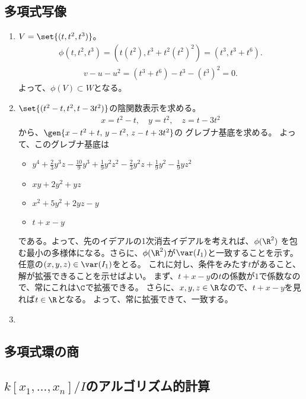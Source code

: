 \label{sec:多様体上の多項式関数と有理関数}

\subsection{多項式写像}
\label{sub:多項式写像}
\begin{enumerate}[label=(\arabic*)]
  \item
  $V=\set{(t,t^2,t^3)}$。
  \begin{align}
    \phi(t,t^2,t^3)=
    (t(t^2),t^3+t^2(t^2)^2)
    =
    (t^3, t^3+t^6).
  \end{align}
  \begin{align}
    v-u-u^2 = (t^3+t^6)-t^3-(t^3)^2 = 0.
  \end{align}
  よって、$\phi(V) \subset W$となる。
  \item
  $\set{(t^2-t,t^2,t-3t^2)}$の陰関数表示を求める。
  \begin{align}
    x=t^2-t,\quad y = t^2,\quad z=t-3t^2
  \end{align}
  から、$\gen{x-t^2+t,\, y-t^2,\, z-t+3t^2}$の
  グレブナ基底を求める。
  よって、このグレブナ基底は
  \begin{itemize}
    \item $y^4 + \frac{2}{3}y^3 z - \frac{10}{9}y^3 + \frac{1}{9}y^2 z^2 -\frac{2}{3}y^2 z + \frac{1}{9}y^2 - \frac{1}{9}yz^2$
    \item $xy + 2y^2 + yz$
    \item $x^2 + 5y^2 + 2yz - y$
    \item $t + x - y$
  \end{itemize}
  である。よって、先のイデアルの1次消去イデアルを考えれば、$\phi(\R^2)$
  を包む最小の多様体になる。さらに、$\phi(\R^2)$が$\var(I_1)$と一致することを示す。
  任意の$(x,y,z)\in \var(I_1)$をとる。
  これに対し、条件をみたす$t$があること、解が拡張できることを示せばよい。
  まず、$t+x-y$の$t$の係数が$1$で係数なので、常にこれは$\C$で拡張できる。
  さらに、$x,y,z\in \R$なので、$t+x-y$を見れば$t\in \R$となる。
  よって、常に拡張できて、一致する。
  \item

\end{enumerate}

\subsection{多項式環の商}
\label{sub:多項式環の商}

\subsection{$k[x_1,\dots,x_n]/I$のアルゴリズム的計算}
\label{sub:のアルゴリズム的計算}

